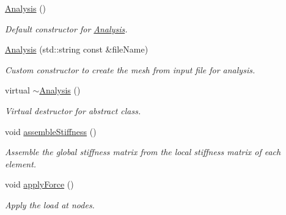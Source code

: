 \begin{DoxyCompactItemize}
\item 
\mbox{\label{class_analysis_a1cf251eb8dc62b30815ab5548ad88f73}} 
\mbox{\hyperlink{class_analysis_a1cf251eb8dc62b30815ab5548ad88f73}{Analysis}} ()
\begin{DoxyCompactList}\small\item\em Default constructor for \mbox{\hyperlink{class_analysis}{Analysis}}. \end{DoxyCompactList}\item 
\mbox{\hyperlink{class_analysis_aae14526bb70c6372fd662b46aab74d2d}{Analysis}} (std\+::string const \&file\+Name)
\begin{DoxyCompactList}\small\item\em Custom constructor to create the mesh from input file for analysis. \end{DoxyCompactList}\item 
\mbox{\label{class_analysis_a172ae0a3cbb68daa373baf081f5c00d9}} 
virtual \mbox{\hyperlink{class_analysis_a172ae0a3cbb68daa373baf081f5c00d9}{$\sim$\+Analysis}} ()
\begin{DoxyCompactList}\small\item\em Virtual destructor for abstract class. \end{DoxyCompactList}\item 
\mbox{\label{class_analysis_a951d32f9e28ea1a5942020f1304208ee}} 
void \mbox{\hyperlink{class_analysis_a951d32f9e28ea1a5942020f1304208ee}{assemble\+Stiffness}} ()
\begin{DoxyCompactList}\small\item\em Assemble the global stiffness matrix from the local stiffness matrix of each element. \end{DoxyCompactList}\item 
\mbox{\label{class_analysis_ab1c7b59927d7787ef75b0bba651b045c}} 
void \mbox{\hyperlink{class_analysis_ab1c7b59927d7787ef75b0bba651b045c}{apply\+Force}} ()
\begin{DoxyCompactList}\small\item\em Apply the load at nodes. \end{DoxyCompactList}\item 
\mbox{\label{class_analysis_aec157316b08568c84d8d8344a724ff89}} 

\end{DoxyCompactItemize}
